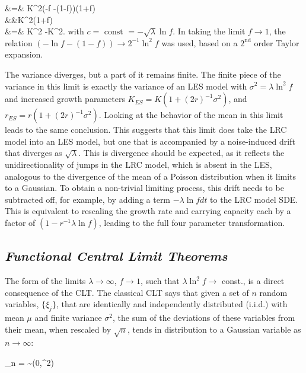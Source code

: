 \bea
\Var[X] &=& K^2(-\ln f -(1-f))\left(1+\ln f\right)\nonumber\\ 
&&K^2\left(1+\ln f\right)\nonumber\\
&=&  K^2 -K^2\sqrt{\lambda}.
\eea
\noindent with $c = \text{ const } = -\sqrt{\lambda}\ln f$.  In taking the limit $f\to1$, the relation $(-\ln f -(1-f)) \to 2^{-1}\ln^2f$ was used, based on a $2^{\text{nd}}$ order Taylor expansion.  

The variance diverges, but a part of it remains finite.  The finite piece of the variance in this limit is exactly the variance of an LES model with $\sigma^2 = \lambda\ln^2 f$ and increased growth parameters $K_{ES} = K(1+(2r)^{-1}\sigma^2)$, and $r_{ES} = r(1+(2r)^{-1}\sigma^2)$.  Looking at the behavior of the mean in this limit leads to the same conclusion.  This suggests that this limit does take the LRC model into an LES model, but one that is accompanied by a noise-induced drift that diverges as $\sqrt{\lambda}$.  This is divergence should be expected, as it reflects the unidirectionality of jumps in the LRC model, which is absent in the LES, analogous to the divergence of the mean of a Poisson distribution when it limits to a Gaussian.  To obtain a non-trivial limiting process, this drift needs to be subtracted off, for example, by adding a term $-\lambda\ln f dt$ to the LRC model SDE.  This is equivalent to rescaling the growth rate and carrying capacity each by a factor of $(1-r^{-1}\lambda\ln f)$, leading to the full four parameter transformation.

  
\subsection*{\textit{Functional Central Limit Theorems}}

The form of the limits  $\lambda\to\infty$, $f\to 1$, such that $\lambda\ln^2f\to$ const., is a direct consequence of the CLT.  The classical CLT says that given a set of $n$ random variables, $\{\xi_j\}$, that are identically and independently distributed (i.i.d.) with mean $\mu$ and finite variance $\sigma^2$, the sum of the deviations of these variables from their mean, when rescaled by $\sqrt{n}$, tends in distribution to a Gaussian variable as $n\to\infty$:

\be
\lim_{n\to\infty} = \eta \sim {}(0,\sigma^2)
\ee

